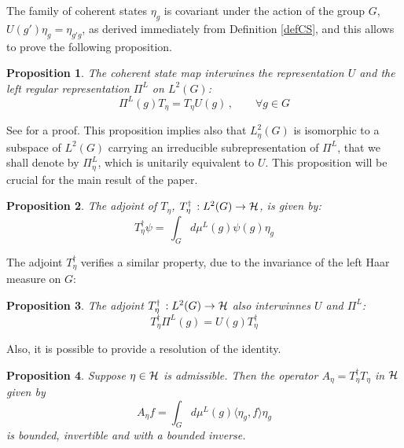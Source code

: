 \documentclass[11pt]{article}
\newtheorem{proposition}{Proposition}[section]
\begin{document}
The family of coherent states $\eta_g$ is covariant under the action of the group $G$, $U(g')\eta_g=\eta_{g'g}$, as derived immediately from Definition \ref{defCS},  and this allows to prove  the following proposition.

\begin{proposition}\label{intenrwinT}
The coherent state map interwines the representation $U$ and the left regular representation $\Pi^L$ on
$L^2(G)$:
%
\begin{equation}
   \Pi^L(g) T_\eta = T_\eta U(g)\,,\qquad \forall g\in G
\end{equation}
\end{proposition}

See \cite{Grossmann85} for a proof. This proposition implies also that $L_\eta^2(G)$ is isomorphic to a subspace of $L^2(G)$
carrying an irreducible subrepresentation of $\Pi^L$, that we shall denote by $\Pi^L_\eta$, which is unitarily equivalent to $U$. This proposition will be crucial for the main result of the paper.

 


\begin{proposition}\label{adjointCSmap}
The adjoint of $T_\eta$,  $T_\eta^\dagger\,: L^2(G)\rightarrow {\cal H}$, is given by:
%
\begin{equation}
 T_\eta^\dagger \psi =\,\int_{G}d\mu^L(g) \psi(g) \eta_g
\end{equation}


\end{proposition}


The adjoint  $T_\eta^\dagger$ verifies a similar property, due to the invariance of the left Haar measure on $G$:

\begin{proposition} \label{intenrwinTd}
 The adjoint $T_\eta^\dagger\,: L^2(G)\rightarrow {\cal H}$ also interwinnes $U$ and $\Pi^L$:
 \begin{equation}
 T_\eta^\dagger \Pi^L(g)=U(g) T_\eta^\dagger 
 \end{equation}


\end{proposition}



Also, it is possible to provide a resolution of the identity.
%
\begin{proposition} \label{Abounded}
 Suppose $\eta\in {\cal H}$ is admissible. Then the operator $A_\eta=T_\eta^\dagger T_\eta$ in $\cal H$ given by 
 \begin{equation}
  A_\eta f=\int_{G}d\mu^L(g) \langle \eta_g,f\rangle \eta_g
 \end{equation}
 is bounded, invertible and with a bounded inverse.

\end{proposition}
\end{document}
